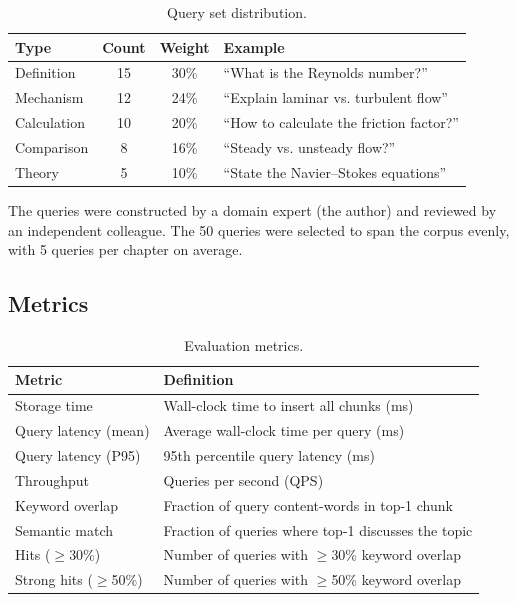 \documentclass[12pt,a4paper]{article}
\theoremstyle{definition}
\theoremstyle{remark}
\begin{document}
\begin{table}[H]
\centering
\caption{Query set distribution.}
\label{tab:queries}
\begin{tabular}{lccl}
\toprule
\textbf{Type} & \textbf{Count} & \textbf{Weight} & \textbf{Example} \\
\midrule
Definition & 15 & 30\% & ``What is the Reynolds number?'' \\
Mechanism & 12 & 24\% & ``Explain laminar vs. turbulent flow'' \\
Calculation & 10 & 20\% & ``How to calculate the friction factor?'' \\
Comparison & 8 & 16\% & ``Steady vs. unsteady flow?'' \\
Theory & 5 & 10\% & ``State the Navier--Stokes equations'' \\
\bottomrule
\end{tabular}
\end{table}

The queries were constructed by a domain expert (the author) and reviewed by an independent colleague. The 50 queries were selected to span the corpus evenly, with 5 queries per chapter on average.

\subsection{Metrics}

\begin{table}[H]
\centering
\caption{Evaluation metrics.}
\label{tab:metrics}
\begin{tabular}{ll}
\toprule
\textbf{Metric} & \textbf{Definition} \\
\midrule
Storage time & Wall-clock time to insert all chunks (ms) \\
Query latency (mean) & Average wall-clock time per query (ms) \\
Query latency (P95) & 95th percentile query latency (ms) \\
Throughput & Queries per second (QPS) \\
Keyword overlap & Fraction of query content-words in top-1 chunk \\
Semantic match & Fraction of queries where top-1 discusses the topic \\
Hits ($\ge$30\%) & Number of queries with $\ge$30\% keyword overlap \\
Strong hits ($\ge$50\%) & Number of queries with $\ge$50\% keyword overlap \\
\bottomrule
\end{tabular}
\end{table}
\end{document}
